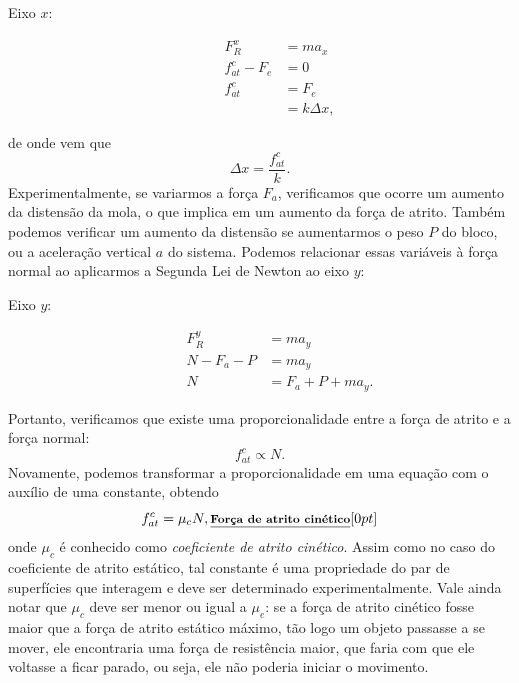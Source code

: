 \begin{description}
    \item[Eixo $x$:]
        \begin{align}
            F_R^x &= m a_x \\
            f_{at}^c - F_e &= 0 \\
            f_{at}^c &= F_e \\
            &= k\Delta x,
        \end{align}
\end{description}
%
de onde vem que 
\begin{equation}
    \Delta x = \frac{f_{at}^c}{k}.
\end{equation}
%
Experimentalmente, se variarmos a força $F_a$, verificamos que ocorre um aumento da distensão da mola, o que implica em um aumento da força de atrito. Também podemos verificar um aumento da distensão se aumentarmos o peso $P$ do bloco, ou a aceleração vertical $a$ do sistema. Podemos relacionar essas variáveis à força normal ao aplicarmos a Segunda Lei de Newton ao eixo $y$:
\begin{description}
    \item[Eixo $y$:]
        \begin{align}
            F_R^y &= m a_y \\
            N - F_a - P &= m a_y \\
            N &= F_a + P + m a_y.
        \end{align}
\end{description}
%
Portanto, verificamos que existe uma proporcionalidade entre a força de atrito e a força normal:
\begin{equation}
    f_{at}^c \propto N.
\end{equation}
%
Novamente, podemos transformar a proporcionalidade em uma equação com o auxílio de uma constante, obtendo
\begin{equation}
    f_{at}^c = \mu_c N, \relax{\footnotesize\emph{\textbf{Força de atrito cinético}}}[0pt]
\end{equation}
%
onde $\mu_c$ é conhecido como \emph{coeficiente de atrito cinético}. Assim como no caso do coeficiente de atrito estático, tal constante é uma propriedade do par de superfícies que interagem e deve ser determinado experimentalmente. Vale ainda notar que $\mu_c$ deve ser menor ou igual a $\mu_e$: se a força de atrito cinético fosse maior que a força de atrito estático máximo, tão logo um objeto passasse a se mover, ele encontraria uma força de resistência maior, que faria com que ele voltasse a ficar parado, ou seja, ele não poderia iniciar o movimento.

